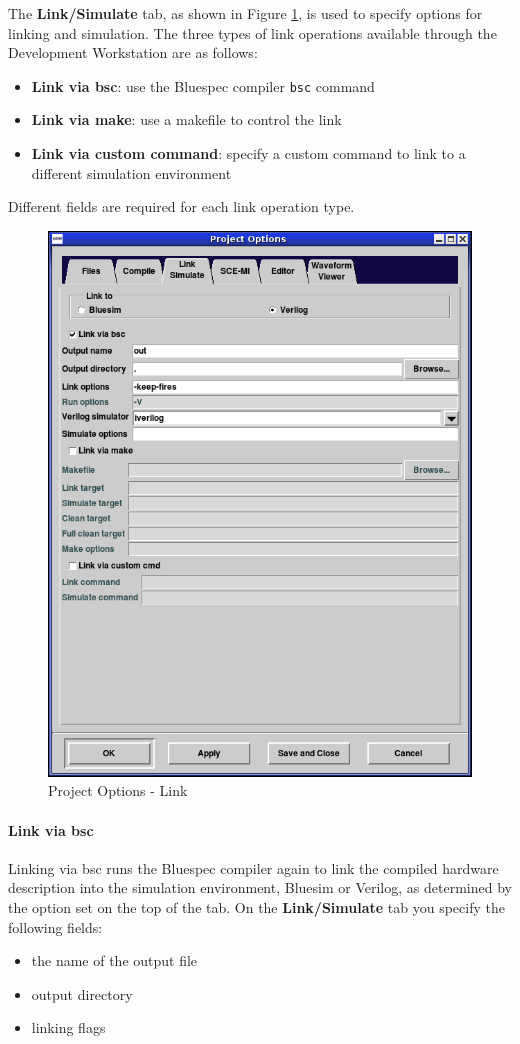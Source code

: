 \documentclass{article}
\newcommand{\te}[1]{\texttt{#1}}
\begin{document}
The {\bf Link/Simulate} tab, as shown in Figure \ref{fig-link},  is
used to specify  options for linking and simulation.  The  three types
of link  operations available
through the Development Workstation are as follows:
\begin{itemize}
\item  {\bf Link via bsc}:  use  the Bluespec compiler \te{bsc} command
\item  {\bf Link via make}: use a  makefile to control the link
\item {\bf Link via custom command}: specify a custom command  to  link
to a different simulation environment
\end{itemize}  Different  fields are required for each link operation type.

\begin{figure}[ht]
\begin{center}
\includegraphics[width = 3 in]{figures/options-link}
\caption{Project Options - Link}
\label{fig-link}
\end{center}
\end{figure}

\paragraph{Link via bsc}
Linking via bsc runs the Bluespec compiler again to link the compiled
hardware description into the simulation environment,  Bluesim or
Verilog,  as determined  by the option set on
the top of the  tab.  On the {\bf Link/Simulate} tab you  specify the
following fields:
\begin{itemize}
\item  the name of the output file
\item output directory
\item  linking flags
\end{itemize}
\end{document}

